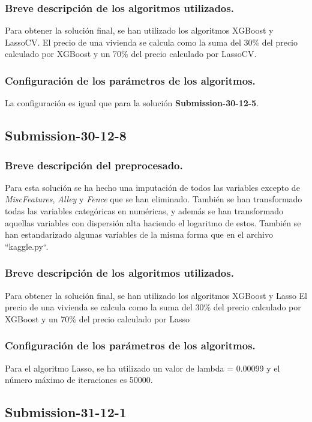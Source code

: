 	\subsubsection{Breve descripción de los algoritmos utilizados.}
		Para obtener la solución final, se han utilizado los algoritmos XGBoost y LassoCV. El precio de una vivienda se calcula como la suma del 30\% del precio calculado por XGBoost y un 70\% del precio calculado por LassoCV.
	\subsubsection{Configuración de los parámetros de los algoritmos.}
		La configuración es igual que para la solución \textbf{Submission-30-12-5}.
	
	
	\subsection{Submission-30-12-8}
	\subsubsection{Breve descripción del preprocesado.}
	Para esta solución se ha hecho una imputación de todos las variables excepto de \textit{MiscFeatures}, \textit{Alley} y \textit{Fence} que se han eliminado. También se han transformado todas las variables categóricas en numéricas, y además se han transformado aquellas variables con dispersión alta haciendo el logaritmo de estos. También se han estandarizado algunas variables de la misma forma que en el archivo ``kaggle.py``.
	\subsubsection{Breve descripción de los algoritmos utilizados.}
	Para obtener la solución final, se han utilizado los algoritmos XGBoost y Lasso El precio de una vivienda se calcula como la suma del 30\% del precio calculado por XGBoost y un 70\% del precio calculado por Lasso
	\subsubsection{Configuración de los parámetros de los algoritmos.}
	Para el algoritmo Lasso, se ha utilizado un valor de lambda = 0.00099 y el número máximo de iteraciones es 50000.
	
	
	\subsection{Submission-31-12-1}
